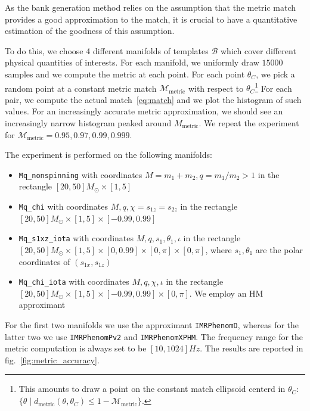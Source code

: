 \documentclass[twocolumn,showpacs,preprintnumbers,nofootinbib,prd,
superscriptaddress,10pt]{revtex4-2}
\begin{document}
As the bank generation method relies on the assumption that the metric match provides a good approximation to the match, it is crucial to have a quantitative estimation of the goodness of this assumption.

To do this, we choose 4 different manifolds of templates $\mathcal{B}$ which cover different physical quantities of interests. For each manifold, we uniformly draw $15000$ samples and we compute the metric at each point.
For each point $\theta_C$, we pick a random point at a constant metric match $\mathcal{M}_{\text{metric}}$ with respect to $\theta_C$\footnote{
This amounts to draw a point on the constant match ellipsoid centerd in
$\theta_C$: $\{\theta \; | \; d_{\text{metric}}(\theta,\theta_C) \leq 1-\mathcal{M}_{\text{metric}} \}$.
}
For each pair, we compute the actual match~\eqref{eq:match} and we plot the histogram of such values. For an increasingly accurate metric approximation, we should see an increasingly narrow histogram peaked around $M_{\text{metric}}$.
We repeat the experiment for $\mathcal{M}_{\text{metric}} = 0.95, 0.97, 0.99, 0.999$.

The experiment is performed on the following manifolds:
\begin{itemize}
	\item \texttt{Mq\_nonspinning} with coordinates $M = m_1+m_2, q = m_1/m_2>1$ in the rectangle $[20, 50] M_\odot \times [1,5]$
	\item \texttt{Mq\_chi} with coordinates $M, q, \chi = s_{1z} = s_{2z}$ in the rectangle $[20, 50] M_\odot \times [1,5] \times [-0.99, 0.99]$
	\item \texttt{Mq\_s1xz\_iota} with coordinates $M, q, s_{1}, \theta_1, \iota$ in the rectangle $[20, 50] M_\odot \times [1,5] \times [0, 0.99] \times [0,\pi]  \times [0,\pi]$, where $s_1, \theta_1$ are the polar coordinates of $(s_{1x}, s_{1z})$
	\item \texttt{Mq\_chi\_iota} with coordinates $M, q, \chi, \iota$ in the rectangle $[20, 50] M_\odot \times [1,5] \times [-0.99, 0.99] \times [0,\pi]$. We employ an HM approximant
\end{itemize}

For the first two manifolds we use the approximant \texttt{IMRPhenomD}, whereas for the latter two we use \texttt{IMRPhenomPv2} and \texttt{IMRPhenomXPHM}. The frequency range for the metric computation is always set to be $[10, 1024]Hz$.
The results are reported in fig.~\ref{fig:metric_accuracy}.
\end{document}
